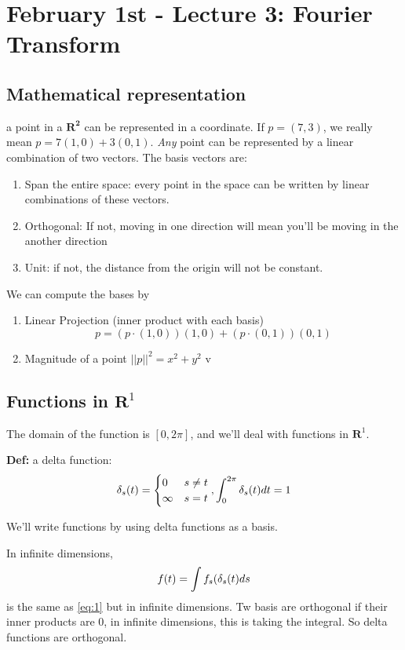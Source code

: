 \pagebreak
\section{February 1st - Lecture 3: Fourier Transform}
\label{sec:lec3}

\subsection{Mathematical representation}

\label{sec:math-repr}
a point in a $\mathbf{R^2}$ can be represented in a
coordinate. If $p=(7,3)$, we really mean $p = 7(1,0) +
3(0,1)$. \emph{Any} point can be represented by a linear combination
of two vectors. The basis vectors are:
\begin{enumerate}
\item Span the entire space: every point in the space can be written by  linear combinations of these vectors.
\item Orthogonal: If not, moving in one direction will mean you'll be
  moving in the another direction 
\item Unit: if not, the distance from the origin will not be constant.
\end{enumerate}

We can compute the bases by
\begin{enumerate}
\item Linear Projection (inner product with each basis) 
  \begin{equation}
p = (p\cdot
  (1,0))(1,0) + (p\cdot (0,1))(0,1)\label{eq:1}  
\end{equation}
\item Magnitude of a point $||p||^2 = x^2 + y^2$
v\end{enumerate}

\subsection{Functions in $\mathbf{R}^1$}
The domain of the function is $[0,2\pi]$, and we'll deal with
functions in $\mathbf{R}^1$.

\textbf{Def:} a delta function: $$\delta_s(t) =
\begin{cases}
  0 & s\neq t\\
\infty & s=t
\end{cases}, \int_0^{2\pi}\delta_s(t) dt = 1$$

We'll write functions by using delta functions as a basis.

In infinite dimensions, 
$$f(t) = \int f_s(\delta_s(t)ds$$ is the same as \eqref{eq:1} but in
infinite dimensions. 
Tw basis are orthogonal if their inner products are 0, in infinite
dimensions, this is taking the integral. So delta functions are orthogonal.

